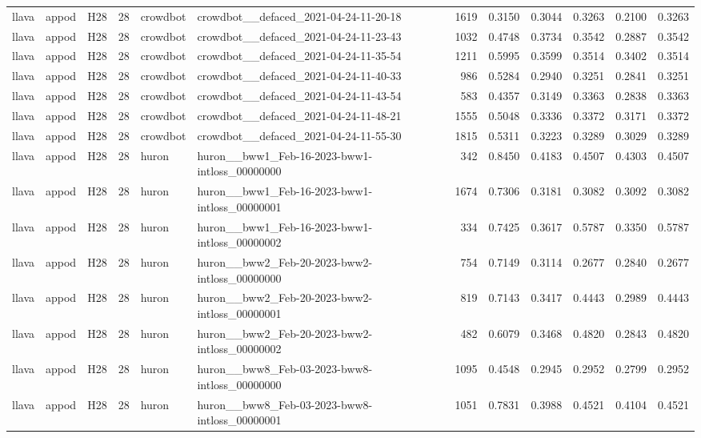 \begin{table}[tbp]
\begin{tabular}{lllrllrrrrrr}
llava & appod & H28 & 28 & crowdbot & crowdbot\_\_defaced\_2021-04-24-11-20-18 & 1619 & 0.3150 & 0.3044 & 0.3263 & 0.2100 & 0.3263 \\
llava & appod & H28 & 28 & crowdbot & crowdbot\_\_defaced\_2021-04-24-11-23-43 & 1032 & 0.4748 & 0.3734 & 0.3542 & 0.2887 & 0.3542 \\
llava & appod & H28 & 28 & crowdbot & crowdbot\_\_defaced\_2021-04-24-11-35-54 & 1211 & 0.5995 & 0.3599 & 0.3514 & 0.3402 & 0.3514 \\
llava & appod & H28 & 28 & crowdbot & crowdbot\_\_defaced\_2021-04-24-11-40-33 & 986 & 0.5284 & 0.2940 & 0.3251 & 0.2841 & 0.3251 \\
llava & appod & H28 & 28 & crowdbot & crowdbot\_\_defaced\_2021-04-24-11-43-54 & 583 & 0.4357 & 0.3149 & 0.3363 & 0.2838 & 0.3363 \\
llava & appod & H28 & 28 & crowdbot & crowdbot\_\_defaced\_2021-04-24-11-48-21 & 1555 & 0.5048 & 0.3336 & 0.3372 & 0.3171 & 0.3372 \\
llava & appod & H28 & 28 & crowdbot & crowdbot\_\_defaced\_2021-04-24-11-55-30 & 1815 & 0.5311 & 0.3223 & 0.3289 & 0.3029 & 0.3289 \\
llava & appod & H28 & 28 & huron & huron\_\_bww1\_Feb-16-2023-bww1-intloss\_00000000 & 342 & 0.8450 & 0.4183 & 0.4507 & 0.4303 & 0.4507 \\
llava & appod & H28 & 28 & huron & huron\_\_bww1\_Feb-16-2023-bww1-intloss\_00000001 & 1674 & 0.7306 & 0.3181 & 0.3082 & 0.3092 & 0.3082 \\
llava & appod & H28 & 28 & huron & huron\_\_bww1\_Feb-16-2023-bww1-intloss\_00000002 & 334 & 0.7425 & 0.3617 & 0.5787 & 0.3350 & 0.5787 \\
llava & appod & H28 & 28 & huron & huron\_\_bww2\_Feb-20-2023-bww2-intloss\_00000000 & 754 & 0.7149 & 0.3114 & 0.2677 & 0.2840 & 0.2677 \\
llava & appod & H28 & 28 & huron & huron\_\_bww2\_Feb-20-2023-bww2-intloss\_00000001 & 819 & 0.7143 & 0.3417 & 0.4443 & 0.2989 & 0.4443 \\
llava & appod & H28 & 28 & huron & huron\_\_bww2\_Feb-20-2023-bww2-intloss\_00000002 & 482 & 0.6079 & 0.3468 & 0.4820 & 0.2843 & 0.4820 \\
llava & appod & H28 & 28 & huron & huron\_\_bww8\_Feb-03-2023-bww8-intloss\_00000000 & 1095 & 0.4548 & 0.2945 & 0.2952 & 0.2799 & 0.2952 \\
llava & appod & H28 & 28 & huron & huron\_\_bww8\_Feb-03-2023-bww8-intloss\_00000001 & 1051 & 0.7831 & 0.3988 & 0.4521 & 0.4104 & 0.4521 \\

\end{tabular}
\end{table}
